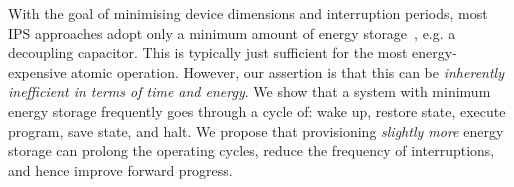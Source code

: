 









With the goal of minimising device dimensions and interruption periods, most IPS approaches adopt only a minimum amount of energy storage~\cite{balsamo2016hibernus++, 10.1145/2700249, 10.1145/2809695.2809707, 10.1145/3281300, 222579, 7403941, 10.1145/3281300}, e.g. a decoupling capacitor. 
This is typically just sufficient for the most energy-expensive atomic operation. 
However, our assertion is that this can be \textit{inherently inefficient in terms of time and energy}. 
We show that a system with minimum energy storage frequently goes through a cycle of: wake up, restore state, execute program, save state, and halt.
We propose that provisioning \textit{slightly more} energy storage can prolong the operating cycles, reduce the frequency of interruptions, and hence improve forward progress. 

